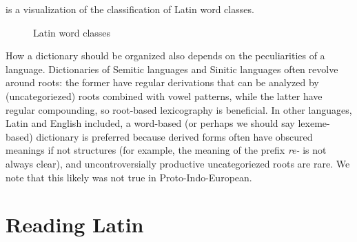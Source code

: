 \documentclass[a4paper, oneside, 12pt]{report}
\newcommand{\form}[1]{\emph{#1}}
\begin{document}
 is a visualization of the classification of Latin word classes.

\begin{figure}
    \centering
    \small
    
    \caption{Latin word classes}
    \label{fig:latin-word-class}
\end{figure}

How a dictionary should be organized also depends on the peculiarities of a language.
Dictionaries of Semitic languages and Sinitic languages often revolve around roots:
the former have regular derivations that can be analyzed by (uncategoriezed) roots combined with vowel patterns,
while the latter have regular compounding,
so root-based lexicography is beneficial.
In other languages, Latin and English included,
a word-based (or perhaps we should say lexeme-based) dictionary is preferred
because derived forms often have obscured meanings if not structures
(for example, the meaning of the prefix \form{re-} is not always clear),
and uncontroversially productive uncategoriezed roots are rare.
We note that this likely was not true in Proto-Indo-European.

\section{Reading Latin}\label{sec:grammatical.parse}
\end{document}
